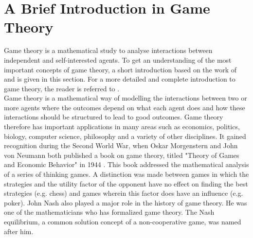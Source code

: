 \section{A Brief Introduction in Game Theory}
\label{Cha1:briefintro}
Game theory is a mathematical study to analyse interactions between independent and self-interested agents. To get an understanding of the most important concepts of game theory, a short introduction based on the work of 
\cite{leyton2008essentials} and \cite{Coursera} is given in this section. For a more detailed and complete introduction to game theory, the reader is referred to 
\cite{leyton2008essentials}.  \\
Game theory is a mathematical way of modelling the interactions between two or more agents where the outcomes depend on what each agent does and how these interactions should be structured to lead to good outcomes. Game theory therefore has important applications in many areas such as economics, politics, biology, computer science, philosophy and a variety of other disciplines. It gained recognition during the Second World War, when Oskar Morgenstern and John von Neumann both published a book on game theory, titled "Theory of Games and Economic Behavior" in 1944 \cite{von1944theory}. This book addressed the mathematical analysis of a series of thinking games. A distinction was made between games in which the strategies and the utility factor of the opponent have no effect on finding the best strategies (e.g. chess) and games wherein this factor does have an influence (e.g. poker). John Nash also played a major role in the history of game theory. He was one of the mathematicians who has formalized game theory. The Nash equilibrium, a common solution concept of a non-cooperative game, was named after him.
~~\\

